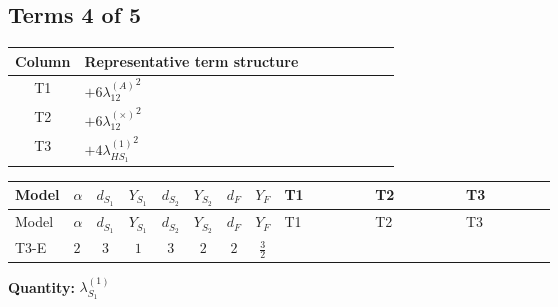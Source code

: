 \documentclass[8pt]{article}
\begin{document}
\begin{landscape}
\subsection*{Terms 4 of 5}
\begin{center}
\begin{tabular}{@{}c >{\raggedright\arraybackslash}p{0.82\linewidth}@{}}
\toprule
Column & Representative term structure \\
\midrule
T1 & \(\displaystyle +6 {\lambda_{12}^{(A)}}^2\) \\
\midrule
T2 & \(\displaystyle +6 {\lambda_{12}^{(\times)}}^2\) \\
\midrule
T3 & \(\displaystyle +4 {\lambda_{HS_1}^{(1)}}^2\) \\
\midrule
\bottomrule
\end{tabular}
\end{center}
\smallskip
\tiny
\begin{longtable}{@{}llcccccc >{\raggedright\arraybackslash}p{0.21\linewidth} >{\raggedright\arraybackslash}p{0.21\linewidth} >{\raggedright\arraybackslash}p{0.21\linewidth}@{}}
\toprule
Model & $\alpha$ & $d_{S_1}$ & $Y_{S_1}$ & $d_{S_2}$ & $Y_{S_2}$ & $d_F$ & $Y_F$ & T1 & T2 & T3 \\
\midrule
\endfirsthead
\toprule
Model & $\alpha$ & $d_{S_1}$ & $Y_{S_1}$ & $d_{S_2}$ & $Y_{S_2}$ & $d_F$ & $Y_F$ & T1 & T2 & T3 \\
\midrule
\endhead
T3-E & $2$ & $3$ & $1$ & $3$ & $2$ & $2$ & $\frac{3}{2}$ & \scriptsize\adjustbox{max width=\linewidth}{$\begin{gathered} +6 {\lambda_{12}^{(A)}}^2\end{gathered}$} & \scriptsize\adjustbox{max width=\linewidth}{$\begin{gathered} +6 {\lambda_{12}^{(\times)}}^2\end{gathered}$} & \scriptsize\adjustbox{max width=\linewidth}{$\begin{gathered} +4 {\lambda_{HS_1}^{(1)}}^2\end{gathered}$} \\
\midrule
\bottomrule
\end{longtable}
\clearpage
\noindent\textbf{Quantity: }$\lambda_{S_1}^{(1)}$\par\smallskip

\end{landscape}
\end{document}
